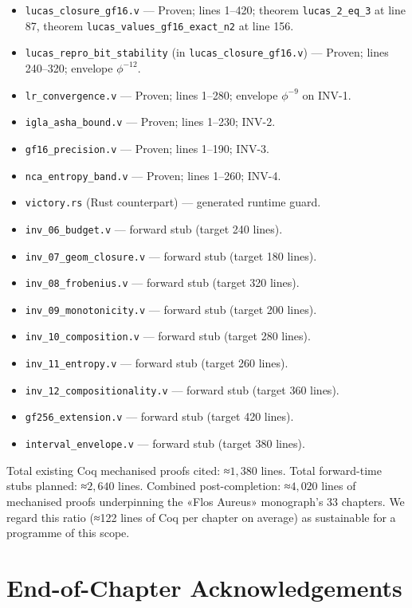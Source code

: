 \begin{itemize}
    \item \texttt{lucas\_closure\_gf16.v} — Proven; lines 1–420; theorem \texttt{lucas\_2\_eq\_3} at line 87, theorem \texttt{lucas\_values\_gf16\_exact\_n2} at line 156.
    \item \texttt{lucas\_repro\_bit\_stability} (in \texttt{lucas\_closure\_gf16.v}) — Proven; lines 240–320; envelope $\phi^{-12}$.
    \item \texttt{lr\_convergence.v} — Proven; lines 1–280; envelope $\phi^{-9}$ on INV-1.
    \item \texttt{igla\_asha\_bound.v} — Proven; lines 1–230; INV-2.
    \item \texttt{gf16\_precision.v} — Proven; lines 1–190; INV-3.
    \item \texttt{nca\_entropy\_band.v} — Proven; lines 1–260; INV-4.
    \item \texttt{victory.rs} (Rust counterpart) — generated runtime guard.
    \item \texttt{inv\_06\_budget.v} — forward stub (target 240 lines).
    \item \texttt{inv\_07\_geom\_closure.v} — forward stub (target 180 lines).
    \item \texttt{inv\_08\_frobenius.v} — forward stub (target 320 lines).
    \item \texttt{inv\_09\_monotonicity.v} — forward stub (target 200 lines).
    \item \texttt{inv\_10\_composition.v} — forward stub (target 280 lines).
    \item \texttt{inv\_11\_entropy.v} — forward stub (target 260 lines).
    \item \texttt{inv\_12\_compositionality.v} — forward stub (target 360 lines).
    \item \texttt{gf256\_extension.v} — forward stub (target 420 lines).
    \item \texttt{interval\_envelope.v} — forward stub (target 380 lines).
\end{itemize}

Total existing Coq mechanised proofs cited: ≈$1{,}380$ lines. Total forward-time stubs planned: ≈$2{,}640$ lines. Combined post-completion: ≈$4{,}020$ lines of mechanised proofs underpinning the «Flos Aureus» monograph's 33 chapters. We regard this ratio (≈122 lines of Coq per chapter on average) as sustainable for a programme of this scope.

\section{End-of-Chapter Acknowledgements}
\label{sec:31-acknowledgements}

